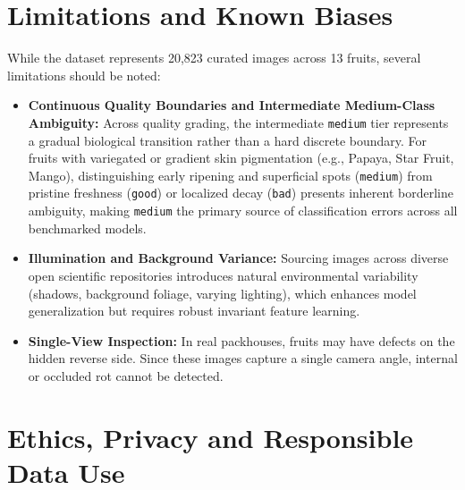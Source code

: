 \documentclass[11pt,a4paper]{article}
\begin{document}
\section{Limitations and Known Biases}
While the dataset represents 20,823 curated images across 13 fruits, several limitations should be noted:
\begin{itemize}
    \item \textbf{Continuous Quality Boundaries and Intermediate Medium-Class Ambiguity:} Across quality grading, the intermediate \texttt{medium} tier represents a gradual biological transition rather than a hard discrete boundary. For fruits with variegated or gradient skin pigmentation (e.g., Papaya, Star Fruit, Mango), distinguishing early ripening and superficial spots (\texttt{medium}) from pristine freshness (\texttt{good}) or localized decay (\texttt{bad}) presents inherent borderline ambiguity, making \texttt{medium} the primary source of classification errors across all benchmarked models.
    \item \textbf{Illumination and Background Variance:} Sourcing images across diverse open scientific repositories introduces natural environmental variability (shadows, background foliage, varying lighting), which enhances model generalization but requires robust invariant feature learning.
    \item \textbf{Single-View Inspection:} In real packhouses, fruits may have defects on the hidden reverse side. Since these images capture a single camera angle, internal or occluded rot cannot be detected.
\end{itemize}

\section{Ethics, Privacy and Responsible Data Use}
\end{document}
